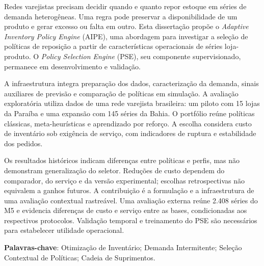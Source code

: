 Redes varejistas precisam decidir quando e quanto repor estoque em séries de demanda heterogêneas. Uma regra pode preservar a disponibilidade de um produto e gerar excesso ou falta em outro. Esta dissertação propõe o \textit{Adaptive Inventory Policy Engine} (AIPE), uma abordagem para investigar a seleção de políticas de reposição a partir de características operacionais de séries loja-produto. O \textit{Policy Selection Engine} (PSE), seu componente supervisionado, permanece em desenvolvimento e validação.

A infraestrutura integra preparação dos dados, caracterização da demanda, sinais auxiliares de previsão e comparação de políticas em simulação. A avaliação exploratória utiliza dados de uma rede varejista brasileira: um piloto com 15 lojas da Paraíba e uma expansão com 145 séries da Bahia. O portfólio reúne políticas clássicas, meta-heurísticas e aprendizado por reforço. A escolha considera custo de inventário sob exigência de serviço, com indicadores de ruptura e estabilidade dos pedidos.

Os resultados históricos indicam diferenças entre políticas e perfis, mas não demonstram generalização do seletor. Reduções de custo dependem do comparador, do serviço e da versão experimental; escolhas retrospectivas não equivalem a ganhos futuros. A contribuição é a formulação e a infraestrutura de uma avaliação contextual rastreável. Uma avaliação externa reúne 2.408 séries do M5 e evidencia diferenças de custo e serviço entre as bases, condicionadas aos respectivos protocolos. Validação temporal e treinamento do PSE são necessários para estabelecer utilidade operacional.

\vspace{2em}
\textbf{Palavras-chave}: Otimização de Inventário; Demanda Intermitente; Seleção Contextual de Políticas; Cadeia de Suprimentos.
